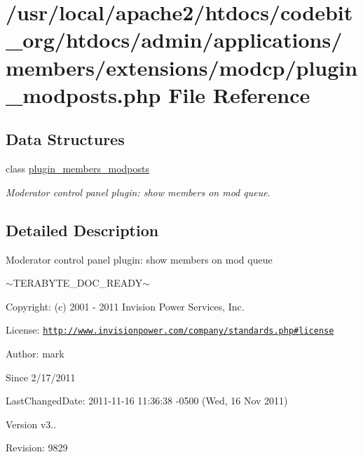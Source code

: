 \hypertarget{plugin__modposts_8php}{\section{/usr/local/apache2/htdocs/codebit\-\_\-org/htdocs/admin/applications/members/extensions/modcp/plugin\-\_\-modposts.php File Reference}
\label{plugin__modposts_8php}
}
\subsection*{Data Structures}
\begin{DoxyCompactItemize}
\item 
class \hyperlink{classplugin__members__modposts}{plugin\-\_\-members\-\_\-modposts}
\begin{DoxyCompactList}\small\item\em Moderator control panel plugin\-: show members on mod queue. \end{DoxyCompactList}\end{DoxyCompactItemize}


\subsection{Detailed Description}
\begin{DoxyVerb}  Moderator control panel plugin: show members on mod queue
\end{DoxyVerb}
 $\sim$\-T\-E\-R\-A\-B\-Y\-T\-E\-\_\-\-D\-O\-C\-\_\-\-R\-E\-A\-D\-Y$\sim$ \begin{DoxyParagraph}{Copyright\-:}
(c) 2001 -\/ 2011 Invision Power Services, Inc.
\end{DoxyParagraph}
\begin{DoxyParagraph}{License\-:}
\href{http://www.invisionpower.com/company/standards.php#license}{\tt http\-://www.\-invisionpower.\-com/company/standards.\-php\#license}
\end{DoxyParagraph}
\begin{DoxyParagraph}{Author\-:}
mark 
\end{DoxyParagraph}
\begin{DoxySince}{Since}
2/17/2011 
\end{DoxySince}
\begin{DoxyParagraph}{Last\-Changed\-Date\-:}
2011-\/11-\/16 11\-:36\-:38 -\/0500 (Wed, 16 Nov 2011) 
\end{DoxyParagraph}
\begin{DoxyVersion}{Version}
v3.. 
\end{DoxyVersion}
\begin{DoxyParagraph}{Revision\-:}
9829 
\end{DoxyParagraph}
